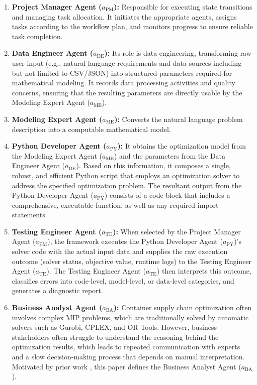 \documentclass[preprint,12pt]{elsarticle}
\begin{document}
\begin{enumerate}[label=\arabic*)]
 \item \textbf{Project Manager Agent ($a_{\text{PM}}$):} Responsible for executing state transitions and managing task allocation. It initiates the appropriate agents, assigns tasks according to the workflow plan, and monitors progress to ensure reliable task completion.
 \item \textbf{Data Engineer Agent ($a_{\text{DE}}$):} Its role is data engineering, transforming raw user input (e.g., natural language requirements and data sources including but not limited to CSV/JSON) into structured parameters required for mathematical modeling. It records data processing activities and quality concerns, ensuring that the resulting parameters are directly usable by the Modeling Expert Agent ($a_{\text{ME}}$).
 \item \textbf{Modeling Expert Agent ($a_{\text{ME}}$):} Converts the natural language problem description into a computable mathematical model.
 \item \textbf{Python Developer Agent ($a_{\text{PY}}$):} It obtains the optimization model from the Modeling Expert Agent ($a_{\text{ME}}$) and the parameters from the Data Engineer Agent ($a_{\text{DE}}$). Based on this information, it composes a single, robust, and efficient Python script that employs an optimization solver to address the specified optimization problem. The resultant output from the Python Developer Agent ($a_{\text{PY}}$) consists of a code block that includes a comprehensive, executable function, as well as any required import statements.
 \item \textbf{Testing Engineer Agent ($a_{\text{TE}}$):} When selected by the Project Manager Agent ($a_{\text{PM}}$), the framework executes the Python Developer Agent ($a_{\text{PY}}$)'s solver code with the actual input data and supplies the raw execution outcome (solver status, objective value, runtime logs) to the Testing Engineer Agent ($a_{\text{TE}}$). The Testing Engineer Agent ($a_{\text{TE}}$) then interprets this outcome, classifies errors into code-level, model-level, or data-level categories, and generates a diagnostic report.
 \item \textbf{Business Analyst Agent ($a_{\text{BA}}$):} Container supply chain optimization often involves complex MIP problems, which are traditionally solved by automatic solvers such as Gurobi, CPLEX, and OR-Tools. However, business stakeholders often struggle to understand the reasoning behind the optimization results, which leads to repeated communication with experts and a slow decision-making process that depends on manual interpretation. Motivated by prior work \citep{liLargeLanguageModels2023}, this paper defines the Business Analyst Agent ($a_{\text{BA}}$).
\end{enumerate}
\end{document}

